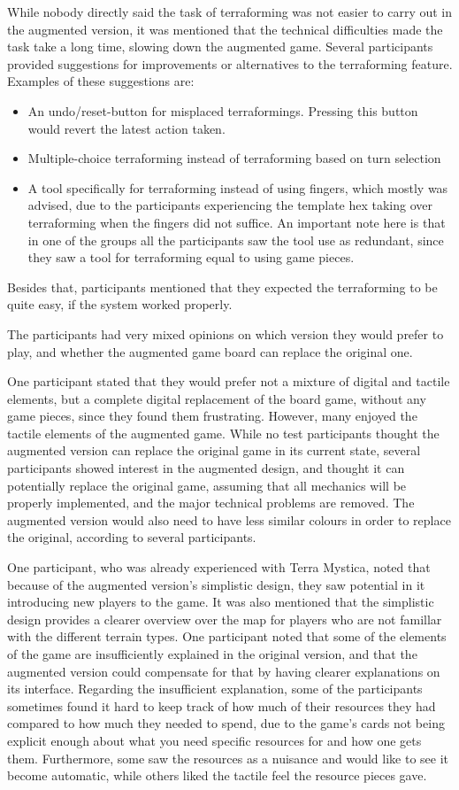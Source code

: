While nobody directly said the task of terraforming was not easier to carry out in the augmented version, it was mentioned that the technical difficulties made the task take a long time, slowing down the augmented game. Several participants provided suggestions for improvements or alternatives to the terraforming feature. Examples of these suggestions are:
\begin{itemize}
\item An undo/reset-button for misplaced terraformings. Pressing this button would revert the latest action taken.
\item Multiple-choice terraforming instead of terraforming based on turn selection
\item A tool specifically for terraforming instead of using fingers, which mostly was advised, due to the participants experiencing the template hex taking over terraforming when the fingers did not suffice. An important note here is that in one of the groups all the participants saw the tool use as redundant, since they saw a tool for terraforming equal to using game pieces.
\end{itemize}
Besides that, participants mentioned that they expected the terraforming to be quite easy, if the system worked properly. 

The participants had very mixed opinions on which version they would prefer to play, and whether the augmented game board can replace the original one.

One participant stated that they would prefer not a mixture of digital and tactile elements, but a complete digital replacement of the board game, without any game pieces, since they found them frustrating. However, many enjoyed the tactile elements of the augmented game. While no test participants thought the augmented version can replace the original game in its current state, several participants showed interest in the augmented design, and thought it can potentially replace the original game, assuming that all mechanics will be properly implemented, and the major technical problems are removed. The augmented version would also need to have less similar colours in order to replace the original, according to several participants.

One participant, who was already experienced with Terra Mystica, noted that because of the augmented version’s simplistic design, they saw potential in it introducing new players to the game. It was also mentioned that the simplistic design provides a clearer overview over the map for players who are not famillar with the different terrain types. One participant noted that some of the elements of the game are insufficiently explained in the original version, and that the augmented version could compensate for that by having clearer explanations on its interface.  Regarding the insufficient explanation, some of the participants sometimes found it hard to keep track of how much of their resources they had compared to how much they needed to spend, due to the game's cards not being explicit enough about what you need specific resources for and how one gets them. Furthermore, some saw the resources as a nuisance and would like to see it become automatic, while others liked the tactile feel the resource pieces gave.

